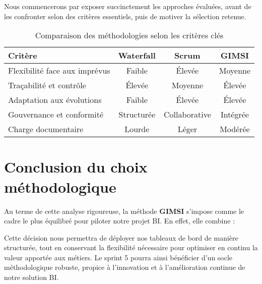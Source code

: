 \documentclass[a4paper,11pt]{report}
\begin{document}
Nous commencerons par exposer succinctement les approches évaluées, avant de les confronter selon des critères essentiels, puis de motiver la sélection retenue.

\vspace{1em}
\begin{table}[h!]
  \centering
  \begin{tabular}{@{}lccc@{}}
    \toprule
    \rowcolor{blue!30} \textbf{Critère}             & \textbf{Waterfall} & \textbf{Scrum}   & \textbf{GIMSI}    \\
    \midrule
    Flexibilité face aux imprévus    & Faible             & Élevée           & Moyenne           \\
    Traçabilité et contrôle          & Élevée             & Moyenne          & Élevée            \\
    Adaptation aux évolutions        & Faible             & Élevée           & Élevée            \\
    Gouvernance et conformité        & Structurée         & Collaborative    & Intégrée          \\
    Charge documentaire              & Lourde             & Léger            & Modérée           \\
    \bottomrule
  \end{tabular}
  \caption{Comparaison des méthodologies selon les critères clés}
  \label{tab:comparaison-methodos}
\end{table}



\section*{Conclusion du choix méthodologique}

Au terme de cette analyse rigoureuse, la méthode \textbf{GIMSI} s’impose comme le cadre le plus équilibré pour piloter notre projet BI. En effet, elle combine :



Cette décision nous permettra de déployer nos tableaux de bord de manière structurée, tout en conservant la flexibilité nécessaire pour optimiser en continu la valeur apportée aux métiers. Le sprint 5 pourra ainsi bénéficier d’un socle méthodologique robuste, propice à l’innovation et à l’amélioration continue de notre solution BI.  
\end{document}
